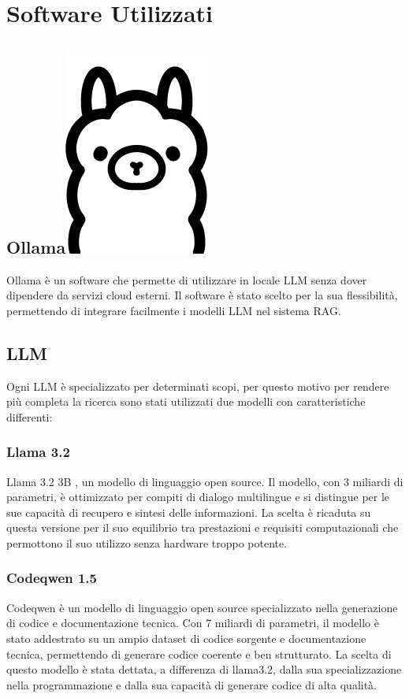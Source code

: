 \documentclass[12pt,a4paper,openright,twoside]{book}
\begin{document}
\section{Software Utilizzati}
\subsection{Ollama\hspace{0.3cm}\protect\includegraphics[width=0.03\linewidth]{figures/ollama.png}}
Ollama \cite{ollama-docs} è un software che permette di utilizzare in locale LLM
senza dover dipendere da servizi cloud esterni.
Il software è stato scelto per la sua flessibilità, permettendo di integrare facilmente i modelli LLM nel sistema RAG.
\subsection{LLM}
Ogni LLM è specializzato per determinati scopi,
per questo motivo per rendere più completa la ricerca sono stati utilizzati due modelli con caratteristiche differenti:
\subsubsection{Llama 3.2}
Llama 3.2 3B \cite{llama3-2}, un modello di linguaggio open source.
Il modello, con 3 miliardi di parametri, è ottimizzato per compiti di dialogo multilingue e si distingue per le sue capacità di recupero e sintesi delle informazioni.
La scelta è ricaduta su questa versione per il suo equilibrio tra prestazioni e requisiti computazionali che permottono il suo utilizzo senza hardware troppo potente.

\subsubsection{Codeqwen 1.5}
Codeqwen \cite{codeqwen1.5} è un modello di linguaggio open source specializzato nella generazione di codice e documentazione tecnica.  
Con 7 miliardi di parametri, il modello è stato addestrato su un ampio dataset di codice sorgente e documentazione tecnica, permettendo di generare codice coerente e ben strutturato.
La scelta di questo modello è stata dettata, a differenza di llama3.2, dalla sua specializzazione nella programmazione e dalla sua capacità di generare codice di alta qualità. 
\end{document}
